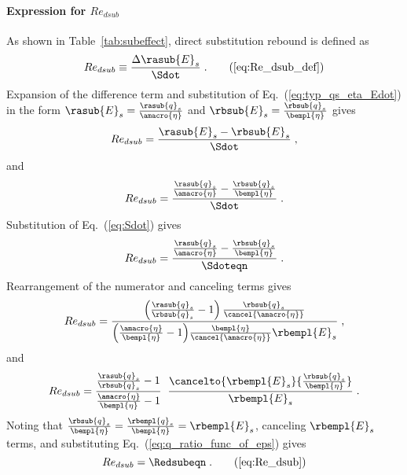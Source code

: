 \paragraph{Expression for $Re_{dsub}$}
\label{sec:Re_dsub}

As shown in Table~\ref{tab:subeffect}, direct substitution rebound is defined as
%
\begin{equation}
  Re_{dsub} \equiv \frac{\Delta \rasub{E}_s}{\Sdot} \; . \tag{\ref{eq:Re_dsub_def}}
\end{equation}
%
Expansion of the difference term and
substitution of Eq.~(\ref{eq:typ_qs_eta_Edot}) in the form
$\rasub{E}_s = \frac{\rasub{q}_s}{\amacro{\eta}}$
and
$\rbsub{E}_s = \frac{\rbsub{q}_s}{\bempl{\eta}}$
gives
%
\begin{equation}
   Re_{dsub} = \frac{\rasub{E}_s - \rbsub{E}_s}{\Sdot} \; ,
\end{equation}
%
and
%
\begin{equation}
     Re_{dsub} = \frac{\frac{\rasub{q}_s}{\amacro{\eta}} - \frac{\rbsub{q}_s}{\bempl{\eta}}}{\Sdot} \; .
\end{equation}
%
Substitution of Eq.~(\ref{eq:Sdot}) gives
%
\begin{equation}
  Re_{dsub} = \frac{\frac{\rasub{q}_s}{\amacro{\eta}} - \frac{\rbsub{q}_s}{\bempl{\eta}}}
              {\Sdoteqn} \; .
\end{equation}
%
Rearrangement of the numerator and canceling terms gives
%
\begin{equation}
  Re_{dsub} = \frac{\left( \frac{\rasub{q}_s}{\rbsub{q}_s} - 1 \right) \frac{\rbsub{q}_s}{\cancel{\amacro{\eta}}} }
              {\left( \frac{\amacro{\eta}}{\bempl{\eta}} - 1 \right)\!\frac{\bempl{\eta}}{\cancel{\amacro{\eta}}} \rbempl{E}_s} \; ,
\end{equation}
%
and
%
\begin{equation}
    Re_{dsub} = \frac{\frac{\rasub{q}_s}{\rbsub{q}_s} - 1}{\frac{\amacro{\eta}}{\bempl{\eta}} - 1} \; \;
                \frac{\cancelto{\rbempl{E}_s}{\frac{\rbsub{q}_s}{\bempl{\eta}}}}{\rbempl{E}_s} \; .
\end{equation}
%
Noting that $\frac{\rbsub{q}_s}{\bempl{\eta}} = \frac{\rbempl{q}_s}{\bempl{\eta}} = \rbempl{E}_s$,
canceling $\rbempl{E}_s$ terms,
and substituting Eq.~(\ref{eq:q_ratio_func_of_eps}) gives
%
\begin{equation}
  Re_{dsub} = \Redsubeqn \; . \tag{\ref{eq:Re_dsub}}
\end{equation}

